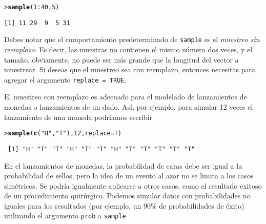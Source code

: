 \documentclass{article}\usepackage[]{graphicx}\usepackage[]{color}
\makeatletter
\newcommand{\hlnum}[1]{\textcolor[rgb]{0.686,0.059,0.569}{#1}}%
\newcommand{\hlstr}[1]{\textcolor[rgb]{0.192,0.494,0.8}{#1}}%
\newcommand{\hlopt}[1]{\textcolor[rgb]{0,0,0}{#1}}%
\newcommand{\hlstd}[1]{\textcolor[rgb]{0.345,0.345,0.345}{#1}}%
\newcommand{\hlkwc}[1]{\textcolor[rgb]{0.333,0.667,0.333}{#1}}%
\newcommand{\hlkwd}[1]{\textcolor[rgb]{0.737,0.353,0.396}{\textbf{#1}}}%
\newenvironment{kframe}{%
 \def\at@end@of@kframe{}%
 \ifinner\ifhmode%
  \def\at@end@of@kframe{\end{minipage}}%
  \begin{minipage}{\columnwidth}%
 \fi\fi%
 \def\FrameCommand##1{\hskip\@totalleftmargin \hskip-\fboxsep
 \colorbox{shadecolor}{##1}\hskip-\fboxsep
     \hskip-\linewidth \hskip-\@totalleftmargin \hskip\columnwidth}%
 \MakeFramed {\advance\hsize-\width
   \@totalleftmargin\z@ \linewidth\hsize
   \@setminipage}}%
 {\par\unskip\endMakeFramed%
 \at@end@of@kframe}
\newenvironment{knitrout}{}{} %
\makeatother
\begin{document}
\begin{knitrout}
\color{fgcolor}\begin{kframe}
\begin{alltt}
\hlstd{> }\hlkwd{sample}\hlstd{(}\hlnum{1}\hlopt{:}\hlnum{40}\hlstd{,} \hlnum{5}\hlstd{)}
\end{alltt}
\begin{verbatim}
[1] 11 29  9  5 31
\end{verbatim}
\end{kframe}
\end{knitrout}

\vspace{0.2cm}

Debes notar que el comportamiento predeterminado de \texttt{sample} es el \textit{muestreo sin reemplazo}. Es decir, las muestras no contienen el mismo n\'umero dos veces, y el tama\~no, obviamente, no puede ser m\'as grande que la longitud del vector a muestrear. Si deseas que el muestreo sea con reemplazo, entonces necesitas para agregar el argumento \texttt{replace = TRUE}.

\vspace{0.3cm}

El muestreo con reemplazo es adecuado para el modelado de lanzamientos de monedas o lanzamientos de un dado. As\'i, por ejemplo, para simular 12 veces el  lanzamiento de una  moneda podr\'iamos escribir


\begin{knitrout}
\color{fgcolor}\begin{kframe}
\begin{alltt}
\hlstd{> }\hlkwd{sample}\hlstd{(}\hlkwd{c}\hlstd{(}\hlstr{"H"}\hlstd{,}\hlstr{"T"}\hlstd{),} \hlnum{12}\hlstd{,} \hlkwc{replace}\hlstd{=T)}
\end{alltt}
\begin{verbatim}
 [1] "H" "T" "T" "H" "T" "T" "H" "T" "T" "T" "T" "T"
\end{verbatim}
\end{kframe}
\end{knitrout}

\vspace{0.3cm}

En el lanzamientos de monedas, la probabilidad de caras debe ser igual a la probabilidad de sellos, pero la idea de un evento al azar no se limita a los casos sim\'etricos. Se podr\'ia igualmente aplicarse a otros casos, como el resultado exitoso de un procedimiento quir\'urgico. Podemos  simular datos con probabilidades no iguales para los resultados (por ejemplo, un $90\%$ de probabilidades de \'exito) utilizando el argumento \texttt{prob} a \texttt{sample}
\end{document}
